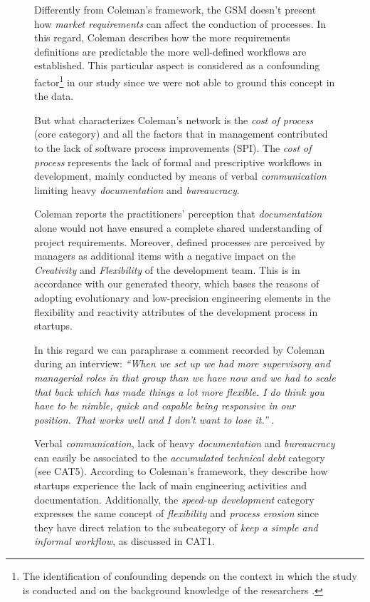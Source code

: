\documentclass[12pt,journal,compsoc]{../sty/IEEEtran}
\begin{document}
\begin{table}[!t]
\begin{figure}[!t]
\begin{compactitem}
Differently from Coleman's framework, the GSM doesn't present how
\textit{market requirements} can affect the conduction of processes. In this
regard, Coleman describes how the more requirements definitions are predictable
the more well-defined workflows are established. This particular aspect is
considered as a confounding factor\footnote{The identification of confounding
depends on the context in which the study is conducted and on the background
knowledge of the researchers \cite{Pearl2011}.}  in our study since we were not
able to ground this concept in the data.

But what characterizes Coleman's network is the \textit{cost of process} (core
category) and all the factors that in management contributed to the lack of
software process improvements (SPI). The \textit{cost of process} represents the
lack of formal and prescriptive workflows in development, mainly conducted by
means of verbal \textit{communication} limiting heavy \textit{documentation} and
\textit{bureaucracy}.

Coleman reports the practitioners' perception that \textit{documentation} alone
would not have ensured a complete shared understanding of project requirements.
Moreover, defined processes are perceived by managers as additional items with a
negative impact on the \textit{Creativity} and \textit{Flexibility} of the
development team. This is in accordance with our generated theory, which bases
the reasons of adopting evolutionary and low-precision engineering elements in
the flexibility and reactivity attributes of the development process in
startups.

In this regard we can paraphrase a comment recorded by Coleman during an
interview: \textit{``When we set up we had more supervisory and managerial roles
in that group than we have now and we had to scale that back which has made
things a lot more flexible. I do think you have to be nimble, quick and capable
being responsive in our position. That works well and I don't want to lose
it.''} \cite{Coleman2007}.

Verbal \textit{communication}, lack of heavy \textit{documentation} and
\textit{bureaucracy} can easily be associated to the \textit{accumulated
technical debt} category (see CAT5). According to Coleman's framework, they
describe how startups experience the lack of main engineering activities and
documentation. Additionally, the \textit{speed-up development} category
expresses the same concept of \textit{flexibility} and \textit{process erosion}
since they have direct relation to the subcategory of \textit{keep a simple and
informal workflow}, as discussed in CAT1.


\end{compactitem}
\end{figure}
\end{table}
\end{document}
